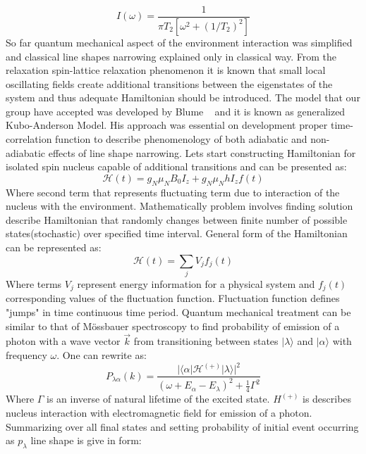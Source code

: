 \begin{equation}\label{eq:fastmodulationshape}
I(\omega)=\frac{1}{\pi T_2[\omega^2+(1/T_2)^2]}
\end{equation}
So far quantum mechanical aspect of the environment interaction was simplified and classical line shapes narrowing explained only in classical way. From the relaxation spin-lattice relaxation phenomenon it is known that small local oscillating fields create additional transitions between the eigenstates of the system and thus adequate Hamiltonian should be introduced. The model that our group have accepted was developed by Blume ~\cite{blume} and it is known as generalized Kubo-Anderson Model. His approach was essential on development proper time-correlation function to describe phenomenology of both adiabatic and non-adiabatic effects of line shape narrowing. Lets start constructing Hamiltonian for isolated spin nucleus capable of additional transitions and can be presented as: 
\begin{equation}\label{eq:29}
\mathcal{H}(t)=g_N\mu_NB_0I_z+g_N\mu_NhI_zf(t)
\end{equation} 
Where second term that represents fluctuating term due to interaction of the nucleus with the environment. Mathematically problem involves finding solution describe Hamiltonian that randomly changes between finite number of possible states(stochastic) over specified time interval. General form of the Hamiltonian can be represented as: 
\begin{equation}\label{eq:ham}
\mathcal{H}(t)=\sum_jV_jf_j(t)
\end{equation}  
Where terms $V_j$ represent energy information for a physical system and $f_j(t)$ corresponding values of the fluctuation function. Fluctuation function defines "jumps" in time continuous time period. Quantum mechanical treatment can be similar to that of M{\"o}ssbauer spectroscopy to find probability of emission of a photon with a wave vector $\vec{k}$ from transitioning between states $|\lambda\rangle$ and $|\alpha\rangle$ with frequency $\omega$. One can rewrite as:
\begin{equation}\label{eq:30}
P_{\lambda \alpha}(k)=\frac{|\langle \alpha|\mathcal{H}^{(+)}|\lambda\rangle|^2}{(\omega+E_{\alpha}-E_{\lambda})^2+\frac{1}{4}\Gamma^2}
\end{equation} 
Where $\Gamma$ is an inverse of natural lifetime of the excited state. $H^{(+)}$ is describes nucleus interaction with electromagnetic field for emission of a photon. Summarizing over all final states and setting probability of initial event occurring as $p_{\lambda}$ line shape is give in form:
